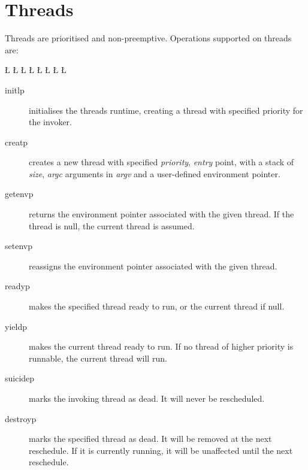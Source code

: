 \section{Threads}
Threads are prioritised and
non-preemptive.  Operations supported on threads are:
\begin{tgrind}
\L{\LB{}}
\L{\LB{}}
\L{\LB{}}
\L{\LB{}}
\L{\LB{}}
\L{\LB{}}
\L{\LB{}}
\L{\LB{}}
\end{tgrind}
\begin{description}
\item[initlp] initialises the threads runtime, creating a thread with
specified priority for the invoker.
\item[creatp] creates a new thread with specified {\em priority}, {\em
entry} point, with a stack of {\em size}, {\em argc} arguments in {\em
argv} and a user-defined environment pointer.
\item[getenvp] returns the environment pointer associated with the given
thread.  If the thread is null, the current thread is assumed.
\item[setenvp] reassigns the environment pointer associated with the
given thread.
\item[readyp] makes the specified thread ready to run, or the current
thread if null.
\item[yieldp] makes the current thread ready to run.  If no thread of 
higher priority is runnable, the current thread will run.
\item[suicidep] marks the invoking thread as dead.  It will never be
rescheduled.
\item[destroyp] marks the specified thread as dead.  It will be removed
at the next reschedule.  If it is currently running, it will be
unaffected until the next reschedule.
\end{description}

